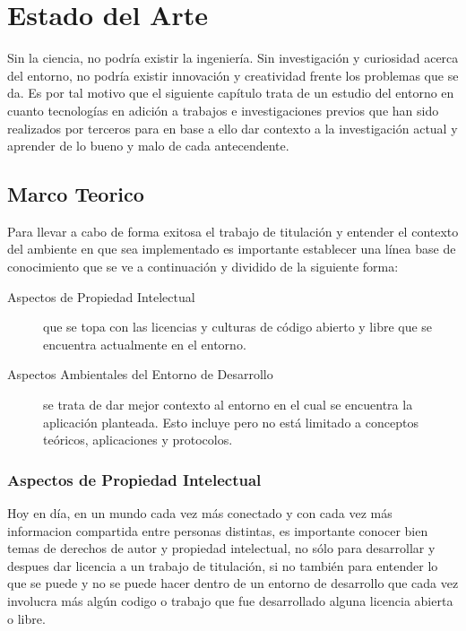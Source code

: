 
\chapter{Estado del Arte}
\label{capitulo2}

Sin la ciencia, no podría existir la ingeniería. Sin investigación y curiosidad acerca del entorno, no podría existir innovación y creatividad frente los problemas que se da. Es por tal motivo que el siguiente capítulo trata de un estudio del entorno en cuanto tecnologías en adición a trabajos e investigaciones previos que han sido realizados por terceros para en base a ello dar contexto a la investigación actual y aprender de lo bueno y malo de cada antecendente.


\section{Marco Teorico}
Para llevar a cabo de forma exitosa el trabajo de titulación y entender el contexto del ambiente en que sea implementado es importante establecer una línea base de conocimiento que se ve a continuación y dividido de la siguiente forma:
\begin{description}
	\item[Aspectos de Propiedad Intelectual] que se topa con las licencias y culturas de código abierto y libre que se encuentra actualmente en el entorno.
    \item[Aspectos Ambientales del Entorno de Desarrollo] se trata de dar mejor contexto al entorno en el cual se encuentra la aplicación planteada. Esto incluye pero no está limitado a conceptos teóricos, aplicaciones y protocolos.
\end{description}

\subsection{Aspectos de Propiedad Intelectual}
Hoy en día, en un mundo cada vez más conectado y con cada vez más informacion compartida entre personas distintas, es importante conocer bien temas de derechos de autor y propiedad intelectual, no sólo para desarrollar y despues dar licencia a un trabajo de titulación, si no también para entender lo que se puede y no se puede hacer dentro de un entorno de desarrollo que cada vez involucra más algún codigo o trabajo que fue desarrollado alguna licencia abierta o libre.

